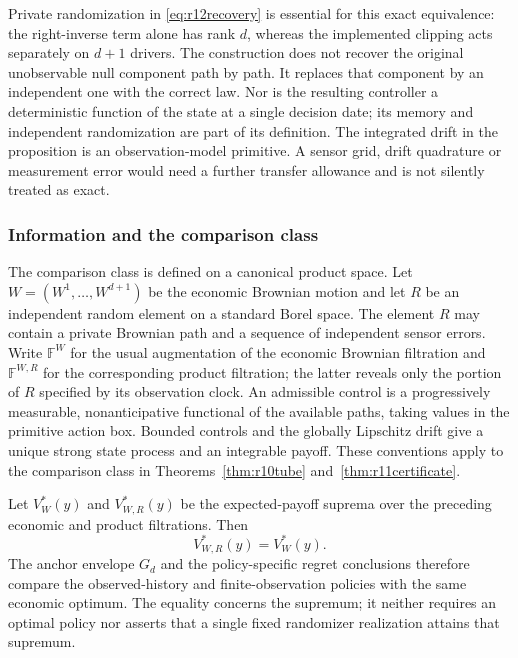 Private randomization in \eqref{eq:r12recovery} is essential for this exact equivalence: the right-inverse term alone has rank $d$, whereas the implemented clipping acts separately on $d+1$ drivers. The construction does not recover the original unobservable null component path by path. It replaces that component by an independent one with the correct law. Nor is the resulting controller a deterministic function of the state at a single decision date; its memory and independent randomization are part of its definition. The integrated drift in the proposition is an observation-model primitive. A sensor grid, drift quadrature or measurement error would need a further transfer allowance and is not silently treated as exact.


\subsubsection{Information and the comparison class}\label{sec:r14filtration}
The comparison class is defined on a canonical product space. Let
$W=(W^1,\ldots,W^{d+1})$ be the economic Brownian motion and let $R$ be
an independent random element on a standard Borel space. The element $R$
may contain a private Brownian path and a sequence of independent sensor
errors. Write $\mathbb F^W$ for the usual augmentation of the economic
Brownian filtration and $\mathbb F^{W,R}$ for the corresponding product
filtration; the latter reveals only the portion of $R$ specified by its
observation clock. An admissible control is a progressively measurable,
nonanticipative functional of the available paths, taking values in the
primitive action box. Bounded controls and the globally Lipschitz drift
give a unique strong state process and an integrable payoff. These
conventions apply to the comparison class in
Theorems~\ref{thm:r10tube} and~\ref{thm:r11certificate}.

\begin{proposition}
\label{prop:r14randomization}
Let $V_W^*(y)$ and $V_{W,R}^*(y)$ be the expected-payoff suprema over the
preceding economic and product filtrations. Then
\[
                 V_{W,R}^*(y)=V_W^*(y).
\]
The anchor envelope $G_d$ and the policy-specific regret conclusions
therefore compare the observed-history and finite-observation policies
with the same economic optimum. The equality concerns the supremum;
it neither requires an optimal policy nor asserts that a single fixed
randomizer realization attains that supremum.
\end{proposition}


